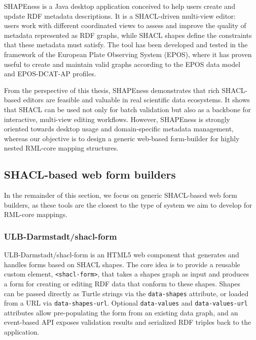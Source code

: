 SHAPEness is a Java desktop application conceived to help users create and update RDF metadata descriptions.\cite{shapeness-github} It is a SHACL-driven multi-view editor: users work with different coordinated views to assess and improve the quality of metadata represented as RDF graphs, while SHACL shapes define the constraints that these metadata must satisfy. The tool has been developed and tested in the framework of the European Plate Observing System (EPOS), where it has proven useful to create and maintain valid graphs according to the EPOS data model and EPOS-DCAT-AP profiles.\cite{shapeness-paper}\cite{shapeness-knmi}

From the perspective of this thesis, SHAPEness demonstrates that rich SHACL-based editors are feasible and valuable in real scientific data ecosystems. It shows that SHACL can be used not only for batch validation but also as a backbone for interactive, multi-view editing workflows. However, SHAPEness is strongly oriented towards desktop usage and domain-specific metadata management, whereas our objective is to design a generic web-based form-builder for highly nested RML-core mapping structures.


\subsection{SHACL-based web form builders}

In the remainder of this section, we focus on generic SHACL-based web form builders, as these tools are the closest to the type of system we aim to develop for RML-core mappings.

\subsubsection{ULB-Darmstadt/shacl-form}

ULB-Darmstadt/shacl-form is an HTML5 web component that generates and handles forms based on SHACL shapes. The core idea is to provide a reusable custom element, \texttt{<shacl-form>}, that takes a shapes graph as input and produces a form for creating or editing RDF data that conform to these shapes.\cite{ulb-darmstadt-shacl-form-demo} Shapes can be passed directly as Turtle strings via the \texttt{data-shapes} attribute, or loaded from a URL via \texttt{data-shapes-url}. Optional \texttt{data-values} and \texttt{data-values-url} attributes allow pre-populating the form from an existing data graph, and an event-based API exposes validation results and serialized RDF triples back to the application.\cite{ulb-darmstadt-shacl-form}\cite{ulb-darmstadt-npm}


